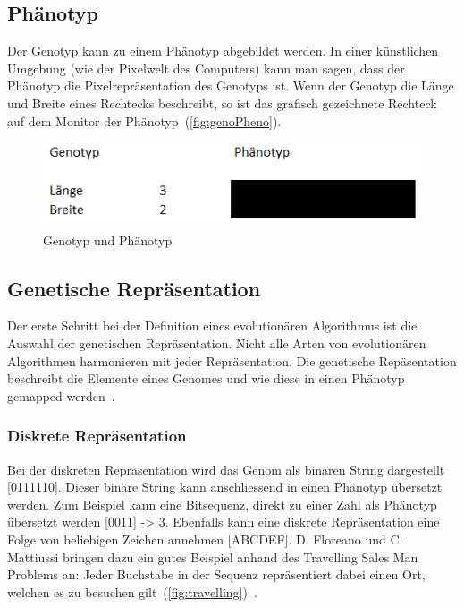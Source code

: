     \subsection{Phänotyp\label{sub:phenotyp}}
        Der Genotyp kann zu einem Phänotyp abgebildet werden.
        In einer künstlichen Umgebung (wie der Pixelwelt des Computers) kann man sagen,
        dass der Phänotyp die Pixelrepräsentation des Genotyps ist.
        Wenn der Genotyp die Länge und Breite eines Rechtecks beschreibt, so ist das grafisch gezeichnete Rechteck auf dem Monitor der Phänotyp~(\vref{fig:genoPheno}).
        \begin{figure}[H]
          \includegraphics[scale=1]{graphics/genotyp_phenotyp}
          \caption{Genotyp und Phänotyp\label{fig:genoPheno}}
        \end{figure}

    \subsection{Genetische Repräsentation}

    Der erste Schritt bei der Definition eines evolutionären Algorithmus ist die Auswahl der genetischen Repräsentation.
    Nicht alle Arten von evolutionären Algorithmen harmonieren mit jeder Repräsentation.
    Die genetische Repäsentation beschreibt die Elemente eines Genomes und wie diese in einen Phänotyp gemapped werden~\cite[S.16]{book:bioInspired}.

      \subsubsection{Diskrete Repräsentation\label{par:GeneticRepresentationDiscrete}}

        Bei der diskreten Repräsentation wird das Genom als binären String dargestellt [0111110].
        Dieser binäre String kann anschliessend in einen Phänotyp übersetzt werden.
        Zum Beispiel kann eine Bitsequenz, direkt zu einer Zahl als Phänotyp übersetzt werden [0011] -> 3.
        Ebenfalls kann eine diskrete Repräsentation eine Folge von beliebigen Zeichen annehmen [ABCDEF].
        D. Floreano und C. Mattiussi bringen dazu ein gutes Beispiel anhand des Travelling Sales Man Problems an:
        Jeder Buchstabe in der Sequenz repräsentiert dabei einen Ort, welchen es zu besuchen gilt~(\vref{fig:travelling})~\cite[S.18]{book:bioInspired}.


